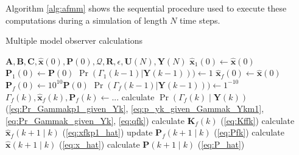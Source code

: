 Algorithm \ref{alg:afmm} shows the sequential procedure used to execute these computations during a simulation of length $N$ time steps.

\begin{algorithm}
	\caption{Multiple model observer calculations}  \label{alg:afmm}
	\begin{algorithmic}
			\Require $\mathbf{A},\mathbf{B},\mathbf{C},\mathbf{\hat{x}}(0), \mathbf{P}(0), \mathcal{Q}, \mathbf{R}, \epsilon, \mathbf{U}(N), \mathbf{Y}(N)$
			\State $\mathbf{\hat{x}}_1(0) \gets \mathbf{\hat{x}}(0)$    %
			\State $\mathbf{P}_1(0) \gets \mathbf{P}(0)$
			\State $\Pr(\Gamma_1(k-1)|\mathbf{Y}(k-1))) \gets 1$
			\State $\mathbf{\hat{x}}_f(0) \gets \mathbf{\hat{x}}(0)$
			\State $\mathbf{P}_f(0) \gets 10^{10}\mathbf{P}(0)$
			\State $\Pr(\Gamma_f(k-1)|\mathbf{Y}(k-1))) \gets 1^{-10}$
			\EndFor
			\State $\Gamma_f(k), \mathbf{\hat{x}}_f(k), \mathbf{P}_f(k) \gets ...$   %
			\State calculate $\Pr(\Gamma_f(k) \mid \mathbf{Y}(k))$ (\ref{eq:Pr_Gammakp1_given_Yk}, \ref{eq:p_yk_given_Gammak_Ykm1}, \ref{eq:Pr_Gammak_given_Yk}, \ref{eq:qfk})
			\State calculate $\mathbf{K}_f(k)$ (\ref{eq:Kffk}) 
			\State calculate $\mathbf{\hat{x}}_f(k+1 \mid k)$ (\ref{eq:xfkp1_hat})
			\State update $\mathbf{P}_f(k+1 \mid k)$ (\ref{eq:Pfk})
			\EndFor
			\State calculate $\mathbf{\hat{x}}(k+1 \mid k)$ (\ref{eq:x_hat}) 
			\State calculate $\mathbf{P}(k+1 \mid k)$ (\ref{eq:P_hat})   %
			\EndFor
		\end{algorithmic}
\end{algorithm}

